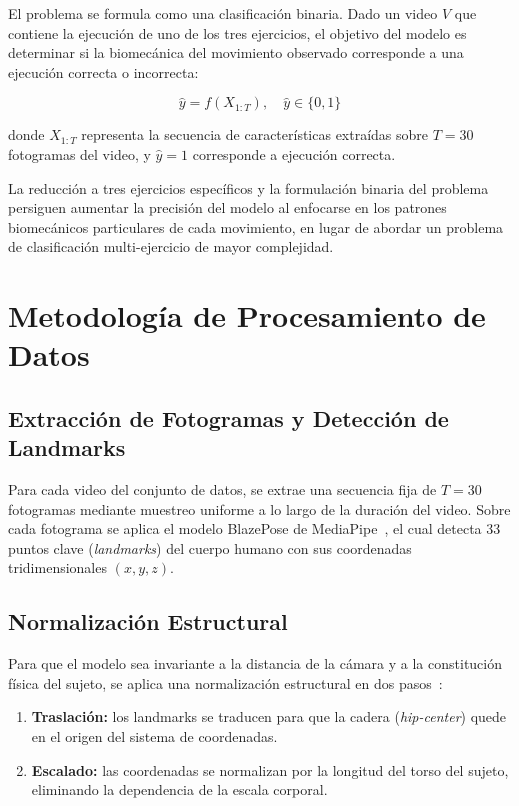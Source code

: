 \documentclass[conference]{IEEEtran}
\begin{document}
El problema se formula como una clasificación binaria. Dado un
video $V$ que contiene la ejecución de uno de los tres ejercicios,
el objetivo del modelo es determinar si la biomecánica del
movimiento observado corresponde a una ejecución correcta o
incorrecta:

\begin{equation}
  \hat{y} = f(X_{1:T}), \quad \hat{y} \in \{0, 1\}
  \label{eq:problem}
\end{equation}

donde $X_{1:T}$ representa la secuencia de características
extraídas sobre $T = 30$ fotogramas del video, y $\hat{y} = 1$
corresponde a ejecución correcta.

La reducción a tres ejercicios específicos y la formulación binaria
del problema persiguen aumentar la precisión del modelo al
enfocarse en los patrones biomecánicos particulares de cada
movimiento, en lugar de abordar un problema de clasificación
multi-ejercicio de mayor complejidad.

\section{Metodología de Procesamiento de Datos}
\label{sec:methodology}

\subsection{Extracción de Fotogramas y Detección de Landmarks}

Para cada video del conjunto de datos, se extrae una secuencia
fija de $T = 30$ fotogramas mediante muestreo uniforme a lo largo
de la duración del video. Sobre cada fotograma se aplica el modelo
BlazePose de MediaPipe~\cite{mediapipe2024}, el cual detecta 33
puntos clave (\textit{landmarks}) del cuerpo humano con sus
coordenadas tridimensionales $(x, y, z)$.

\subsection{Normalización Estructural}

Para que el modelo sea invariante a la distancia de la cámara y
a la constitución física del sujeto, se aplica una normalización
estructural en dos pasos~\cite{ren2020survey}:

\begin{enumerate}
  \item \textbf{Traslación:} los landmarks se traducen para que la
        cadera (\textit{hip-center}) quede en el origen del
        sistema de coordenadas.
  \item \textbf{Escalado:} las coordenadas se normalizan por la
        longitud del torso del sujeto, eliminando la dependencia
        de la escala corporal.
\end{enumerate}
\end{document}
